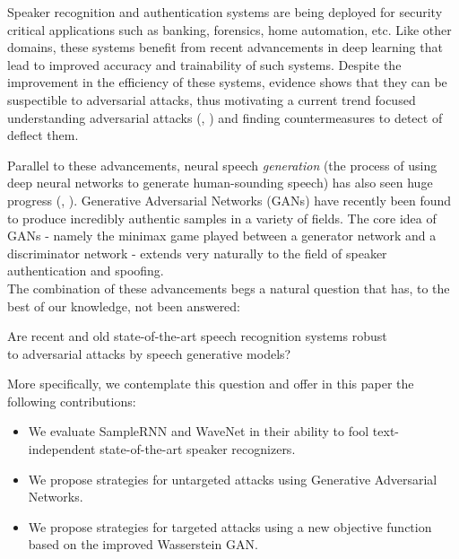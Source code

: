 Speaker recognition and authentication systems are being deployed for security
critical applications such as banking, forensics, home automation, etc. Like
other domains, these systems benefit from recent advancements in deep
learning that lead to improved accuracy and trainability of such systems.
Despite the improvement in the efficiency of these systems, evidence shows that
they can be suspectible to adversarial attacks\cite{wu2015spoofing}, thus motivating a current trend
focused understanding adversarial attacks (\cite{szegedy2013intriguing}, \cite{goodfellow2014explaining}) and finding countermeasures to detect of deflect them. 

Parallel to these advancements, neural speech \textit{generation} (the process of using deep neural networks to generate human-sounding speech) has also seen huge progress (\cite{wang2017tacotron}, \cite{arik2017deep}). Generative Adversarial Networks (GANs) have recently been found to produce incredibly  authentic samples in a variety of fields. The core idea of GANs - namely the minimax game played between a generator network and a discriminator network - extends very naturally to the field of speaker authentication and spoofing. \\
The combination of these advancements begs a natural question that has, to the
best of our knowledge, not been answered:
\begin{center}
Are recent and old state-of-the-art speech recognition systems robust \\to adversarial attacks by speech generative models?
\end{center}

More specifically, we contemplate this question and offer in this paper the following contributions:
\begin{itemize}
\item We evaluate SampleRNN and WaveNet in their ability to fool text-independent state-of-the-art speaker recognizers.
\item We propose strategies for untargeted attacks using Generative Adversarial Networks.
\item We propose strategies for targeted attacks using a new objective function based on the improved Wasserstein GAN.
\end{itemize}
